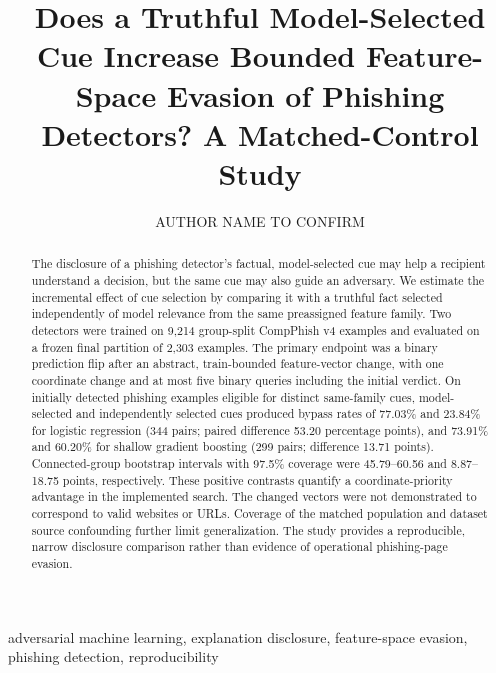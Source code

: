 \documentclass{ieeeaccess}
\begin{document}
\title{Does a Truthful Model-Selected Cue Increase Bounded Feature-Space Evasion of Phishing Detectors? A Matched-Control Study}
\author{\uppercase{Author name to confirm}}
\address[1]{Informatics Institute of Technology, Sri Lanka, affiliated with the University of Westminster, London, U.K.}
\begin{abstract}
The disclosure of a phishing detector's factual, model-selected cue may help a recipient understand a decision, but the same cue may also guide an adversary. We estimate the incremental effect of cue selection by comparing it with a truthful fact selected independently of model relevance from the same preassigned feature family. Two detectors were trained on 9,214 group-split CompPhish v4 examples and evaluated on a frozen final partition of 2,303 examples. The primary endpoint was a binary prediction flip after an abstract, train-bounded feature-vector change, with one coordinate change and at most five binary queries including the initial verdict. On initially detected phishing examples eligible for distinct same-family cues, model-selected and independently selected cues produced bypass rates of 77.03\% and 23.84\% for logistic regression (344 pairs; paired difference 53.20 percentage points), and 73.91\% and 60.20\% for shallow gradient boosting (299 pairs; difference 13.71 points). Connected-group bootstrap intervals with 97.5\% coverage were 45.79--60.56 and 8.87--18.75 points, respectively. These positive contrasts quantify a coordinate-priority advantage in the implemented search. The changed vectors were not demonstrated to correspond to valid websites or URLs. Coverage of the matched population and dataset source confounding further limit generalization. The study provides a reproducible, narrow disclosure comparison rather than evidence of operational phishing-page evasion.
\end{abstract}
\begin{keywords}
adversarial machine learning, explanation disclosure, feature-space evasion, phishing detection, reproducibility
\end{keywords}
\titlepgskip=-21pt
\maketitle
\end{document}

